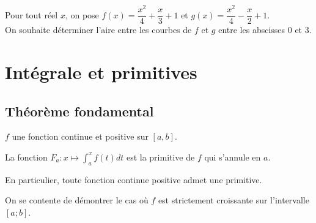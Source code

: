 \documentclass[11pt,fleqn, openany]{book} %
\begin{document}
\begin{example}Pour tout réel $x$, on pose $f(x)=\dfrac{x^2}{4}+\dfrac{x}{3}+1$ et $g(x)=\dfrac{x^2}{4}-\dfrac{x}{2}+1$.\\ On souhaite déterminer l'aire entre les courbes de $f$ et $g$ entre les abscisses 0 et 3.



\vskip150pt

\end{example}
\newpage
\section{Intégrale et primitives}
\subsection{Théorème fondamental}

\begin{theorem}
 $f$ une fonction continue et positive sur $[a,b]$. 
 
La fonction $F_a:x\mapsto \displaystyle\int_{a}^x f(t)dt$ est la primitive de $f$ qui s'annule en $a$.

En particulier, toute fonction continue positive admet une primitive.\end{theorem}

\begin{demonstration} On se contente de démontrer le cas où $f$ est strictement croissante sur l'intervalle $[a;b]$.

\end{demonstration}
\newpage
\end{document}
